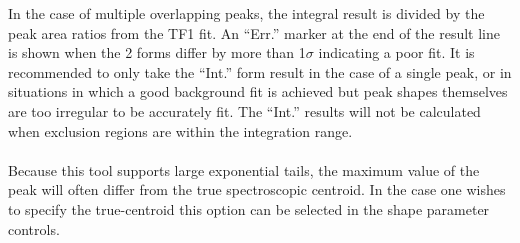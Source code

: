 \documentclass[a4paper,10pt]{article}
\begin{document}
In the case of multiple overlapping peaks, the integral result is divided by the peak area ratios from the TF1 fit. 
An ``Err.'' marker at the end of the result line is shown when the 2 forms differ by more than 1$\sigma$ indicating a poor fit.
It is recommended to only take the ``Int.'' form result in the case of a single peak, or in situations in which a good background fit is achieved but peak shapes themselves are too irregular to be accurately fit.
The ``Int.'' results will not be calculated when exclusion regions are within the integration range.
\\
\\
Because this tool supports large exponential tails, the maximum value of the peak will often differ from the true spectroscopic centroid. In the case one wishes to specify the true-centroid this option can be selected in the shape parameter controls.
\end{document}
